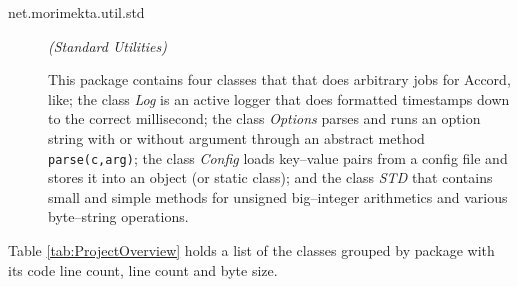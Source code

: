 \begin{small}
\begin{description}
\item[net.morimekta.util.std] {\em (Standard Utilities)}

   This package contains four classes that that does arbitrary jobs for Accord, like;
  the class \emph{Log} is an active logger that does formatted timestamps down to the correct millisecond;
  the class \emph{Options} parses and runs an option string with or without argument through an
     abstract method \texttt{parse(c,arg)};
  the class \emph{Config} loads key--value pairs from a config file and stores it into an object
     (or static class);
  and the class \emph{STD} that contains small and simple methods for unsigned big--integer arithmetics
     and various byte--string operations.

\end{description}
\end{small}

Table \ref{tab:ProjectOverview} holds a list of the classes grouped by package with its
 code line count, line count and byte size.

